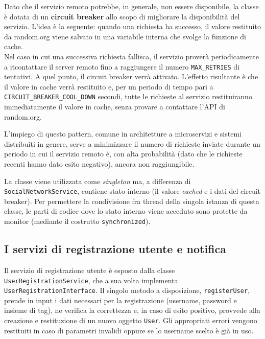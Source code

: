 \documentclass[a4paper,8pt]{article} %
\def\code#1{\texttt{#1}}
\begin{document}
\par Dato che il servizio remoto potrebbe, in generale, non essere disponibile, la classe è dotata di un \textbf{circuit breaker} allo scopo di migliorare la disponibilità del servizio.
L'idea è la seguente: quando una richiesta ha successo, il valore restituito da random.org viene salvato in una variabile interna che svolge la funzione di cache.\\
Nel caso in cui una successiva richiesta fallisca,
il servizio proverà periodicamente a ricontattare il server remoto fino a raggiungere il numero \code{MAX\_RETRIES} di tentativi. A quel punto, il circuit breaker verrà attivato. L'effetto risultante è che il valore in cache verrà
restituito e, per un periodo di tempo pari a \code{CIRCUIT\_BREAKER\_COOL\_DOWN} secondi, tutte le richieste al servizio restituiranno immediatamente il valore in cache, senza provare a contattare l'API di random.org.
\par L'impiego di questo pattern, comune in architetture a microservizi e sistemi distribuiti in genere, serve a minimizzare il numero di richieste inviate durante un periodo in cui il servizio remoto è, con alta probabilità (dato che le richieste recenti hanno dato esito negativo), ancora non raggiungibile.

\par La classe viene utilizzata come \emph{singleton} ma, a differenza di \code{SocialNetworkService}, contiene stato interno (il valore \emph{cached} e i dati del circuit breaker).
Per permettere la condivisione fra thread della singola istanza di questa classe, le parti di codice dove lo stato interno viene acceduto sono protette da monitor (mediante il costrutto \code{synchronized}).

\subsection{I servizi di registrazione utente e notifica}
Il servizio di registrazione utente è esposto dalla classe \code{UserRegistrationService}, che a sua volta implementa \code{UserRegistrationInterface}.
Il singolo metodo a disposizione, \code{registerUser}, prende in input i dati necessari per la registrazione (username, password e insieme di tag), ne verifica la correttezza e,
in caso di esito positivo, provvede alla creazione e restituzione di un nuovo oggetto \code{User}. Gli appropriati errori vengono restituiti in caso di parametri invalidi oppure se lo username
scelto è già in uso.
\end{document}
